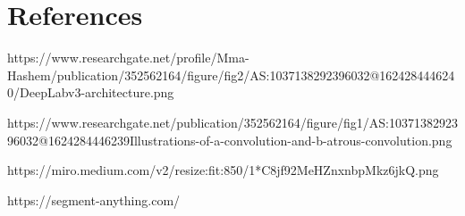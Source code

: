 \section{References}

\begin{thebibliography}{00}

 https://www.researchgate.net/profile/Mma-Hashem/publication/352562164/figure/fig2/AS:1037138292396032@1624284446240/DeepLabv3-architecture.png

 https://www.researchgate.net/publication/352562164/figure/fig1/AS:1037138292396032@1624284446239Illustrations-of-a-convolution-and-b-atrous-convolution.png

 https://miro.medium.com/v2/resize:fit:850/1*C8jf92MeHZnxnbpMkz6jkQ.png

 https://segment-anything.com/

\end{thebibliography}